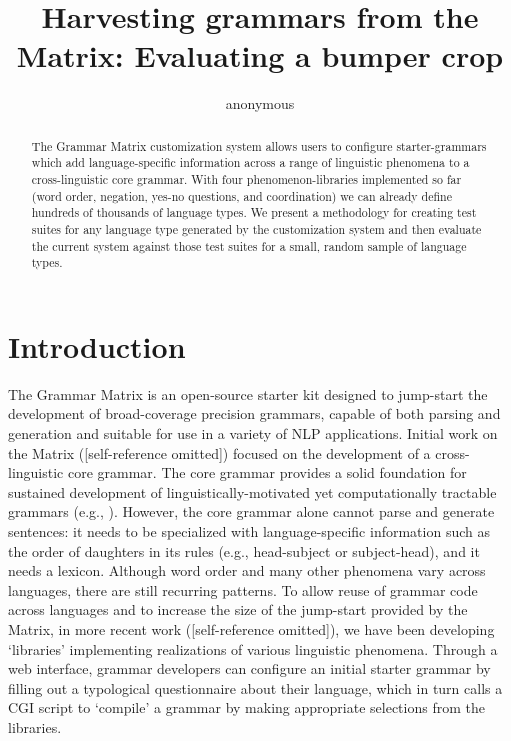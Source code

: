 \documentclass[11pt]{article}
\title{Harvesting grammars from the Matrix: Evaluating a bumper crop}
\author{anonymous}
\date{}
\begin{document}
\maketitle
\begin{abstract}
The Grammar Matrix customization system allows users to configure
starter-grammars which add language-specific information across a
range of linguistic phenomena to a cross-linguistic core grammar.
With four phenomenon-libraries implemented so far (word order,
negation, yes-no questions, and coordination) we can already define
hundreds of thousands of language types.  We present a methodology for
creating test suites for any language type generated by the
customization system and then evaluate the current system against those
test suites for a small, random sample of language types.
\end{abstract}

\section{Introduction}

The Grammar Matrix is an open-source starter kit designed to jump-start
the development of broad-coverage precision grammars, capable of both
parsing and generation and suitable for use in a variety of NLP applications.
Initial work on the Matrix ([self-reference omitted])
focused on the development of a cross-linguistic core grammar.  The
core grammar provides a solid foundation for sustained development of
linguistically-motivated yet computationally tractable grammars (e.g.,
\cite{Hel:Hau:03,Kor:Neu:05}).  However, the core grammar alone cannot
parse and generate sentences: it needs to be specialized with
language-specific information such as the order of daughters in its rules
(e.g., head-subject or subject-head), and it needs a lexicon.
Although word order and many other phenomena vary across languages,
there are still recurring patterns.  To allow reuse of grammar code
across languages and to increase the size of the jump-start provided
by the Matrix, in more recent work ([self-reference omitted]),
we have been developing `libraries' implementing realizations
of various linguistic phenomena.  Through a web interface, grammar
developers can configure an initial starter grammar by filling out
a typological questionnaire about their language, which in turn
calls a CGI script to `compile' a grammar by making appropriate selections
from the libraries.
\end{document}
